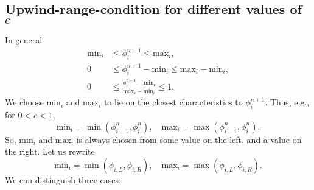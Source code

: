 \documentclass[../thesis.tex]{subfiles}
\begin{document}
\subsection[]{Upwind-range-condition for different values of \(c\)}
In general
\begin{equation}
    \begin{split}
        \mathrm{min}_{i}
        &\leq
        \phi_{i}^{n+1}
        \leq
        \mathrm{max}_{i},
        \\
        0
        &\leq
        \phi_{i}^{n+1} - \mathrm{min}_{i}
        \leq
        \mathrm{max}_{i} - \mathrm{min}_{i},
        \\
        0
        &\leq
        \frac{\phi_{i}^{n+1} - \mathrm{min}_{i}}{\mathrm{max}_{i} - \mathrm{min}_{i}}
        \leq
        1.
    \end{split}
\end{equation}
We choose \(\mathrm{min}_{i}\) and \(\mathrm{max}_{i}\) to lie on the closest characteristics to \(\phi_{i}^{n+1}\). Thus, e.g.,
for \(0 < c < 1\),
\[
    \mathrm{min}_{i} = \min(\phi_{i-1}^{n}, \phi_{i}^{n}),
    \quad
    \mathrm{max}_{i} = \max(\phi_{i-1}^{n}, \phi_{i}^{n}).
\]
So, \(\mathrm{min}_{i}\) and \(\mathrm{max}_{i}\) is always chosen from some value on the left, and a value on the right.
Let us rewrite
\[
    \mathrm{min}_{i} = \min(\phi_{i,L}, \phi_{i,R}),
    \quad
    \mathrm{max}_{i} = \max(\phi_{i,L}, \phi_{i,R}).
\]
We can distinguish three cases:
\end{document}
